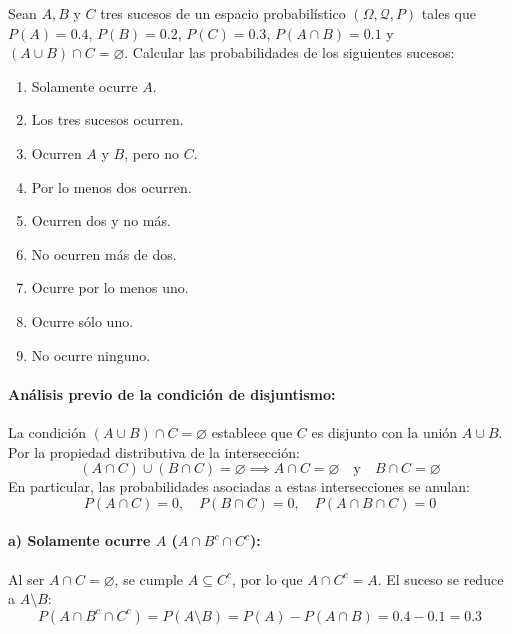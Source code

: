 \newpage
\begin{problema}
Sean $A, B$ y $C$ tres sucesos de un espacio probabilístico $(\Omega, \mathcal{Q}, P)$ tales que $P(A) = 0.4$, $P(B) = 0.2$, $P(C) = 0.3$, $P(A \cap B) = 0.1$ y $(A \cup B) \cap C = \varnothing$. Calcular las probabilidades de los siguientes sucesos:
\begin{enumerate}[label=\alph*)]
    \item Solamente ocurre $A$.
    \item Los tres sucesos ocurren.
    \item Ocurren $A$ y $B$, pero no $C$.
    \item Por lo menos dos ocurren.
    \item Ocurren dos y no más.
    \item No ocurren más de dos.
    \item Ocurre por lo menos uno.
    \item Ocurre sólo uno.
    \item No ocurre ninguno.
\end{enumerate}

\tcblower

\paragraph{Análisis previo de la condición de disjuntismo:}
La condición $(A \cup B) \cap C = \varnothing$ establece que $C$ es disjunto con la unión $A \cup B$. Por la propiedad distributiva de la intersección:
\[
    (A \cap C) \cup (B \cap C) = \varnothing \implies A \cap C = \varnothing \quad \text{y} \quad B \cap C = \varnothing
\]
En particular, las probabilidades asociadas a estas intersecciones se anulan:
\[
    P(A \cap C) = 0, \quad P(B \cap C) = 0, \quad P(A \cap B \cap C) = 0
\]

\paragraph{a) Solamente ocurre $A$ ($A \cap B^c \cap C^c$):}
Al ser $A \cap C = \varnothing$, se cumple $A \subseteq C^c$, por lo que $A \cap C^c = A$. El suceso se reduce a $A \setminus B$:
\[
    P(A \cap B^c \cap C^c) = P(A \setminus B) = P(A) - P(A \cap B) = 0.4 - 0.1 = 0.3
\]


\end{problema}
